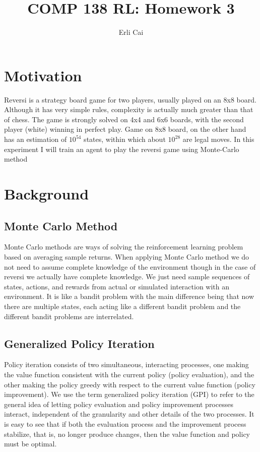 \documentclass[12pt]{article}
\title{COMP 138 RL: Homework 3}
\author{Erli Cai}
\begin{document}
\maketitle
\setlength\parindent{0pt}


\section{Motivation}
Reversi is a strategy board game for two players, usually played on an 8x8 board. Although it has very simple rules, complexity is actually much greater than that of chess. The game is strongly solved on 4x4 and 6x6 boards, with the second player (white) winning in perfect play. Game on 8x8 board, on the other hand has an estimation of  $10^{54}$ states, within which about $10^{28}$ are legal moves. In this experiment I will train an agent to play the reversi game using Monte-Carlo method


\section{Background}
\subsection{Monte Carlo Method}
Monte Carlo methods are ways of solving the reinforcement learning problem based on averaging sample returns. When applying Monte Carlo method we do not need to assume complete knowledge of the environment though in the case of reversi we actually have complete knowledge. We just need sample sequences of states, actions, and rewards from actual or simulated interaction with an environment. It is like a bandit problem with the main difference being that now there are multiple states, each acting like a different bandit problem and the different bandit problems are interrelated.


\subsection{Generalized Policy Iteration}
Policy iteration consists of two simultaneous, interacting processes, one making the value function consistent with the current policy (policy evaluation), and the other making the policy greedy with respect to the current value function (policy improvement). We use the term generalized policy iteration (GPI) to refer to the general idea of letting policy evaluation and policy improvement processes interact, independent of the granularity and other details of the two processes. It is easy to see that if both the evaluation process and the improvement process stabilize, that is, no longer produce changes, then the value function and policy must be optimal. 
\end{document}
